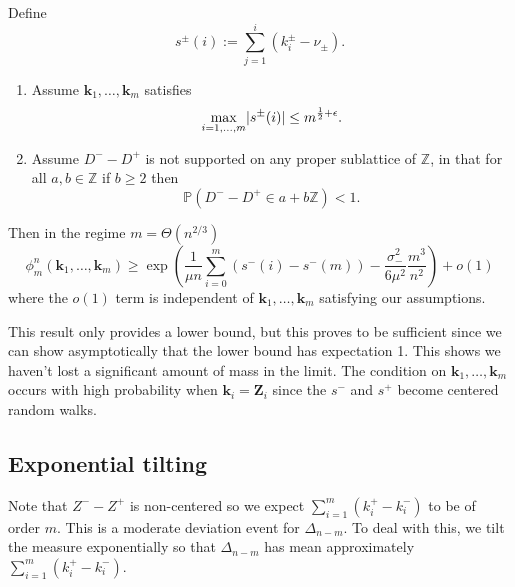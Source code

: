 \documentclass[draft]{scrartcl}
\newcommand{\Z}{\mathbb Z}
\newcommand{\littleo}{o}
\newcommand{\conmc}{\phi}
\newcommand{\defeq}{:=}
\newcommand{\vect}{\mathbf}
\renewcommand{\Pr}{\mathbb P}
\DeclarePairedDelimiter{\abs}{\lvert}{\rvert}
\newcommand{\biasvar}{\sigma_-^2}
\begin{document}
\begin{theorem}
    Define
    \begin{equation}
        s^{\pm}(i) \defeq \textstyle{\sum_{j=1}^i (k_i^{\pm} - \nu_{\pm})}.
    \end{equation}
    \begin{enumerate}
        \item Assume $\vect{k}_1, \ldots, \vect{k}_m$ satisfies
            \begin{equation}
                \label{eq:s-condition}
                \max_{i=1, \ldots, m} \abs{s^{\pm}(i)} \leq m^{\frac{1}{2} + \epsilon}.
            \end{equation}
        \item Assume $D^- - D^+$ is not supported on any proper sublattice of $\Z$, in that for all $a, b \in \Z$ if $b \geq 2$ then
            \begin{equation}
                \Pr(D^- - D^+ \in a + b\Z) < 1.
            \end{equation}
    \end{enumerate}
    Then in the regime $m = \Theta(n^{2/3})$
    \begin{equation}
        \conmc^n_m(\vect{k}_1, \ldots, \vect{k}_m)
        \geq \exp\left( \frac{1}{\mu n} \sum_{i=0}^m (s^-(i) - s^-(m)) - \frac{\biasvar}{6 \mu^2} \frac{m^3}{n^2} \right) + \littleo(1)
    \end{equation}
    where the $\littleo(1)$ term is independent of $\vect{k}_1, \ldots, \vect{k}_m$ satisfying our assumptions.
\end{theorem}

This result only provides a lower bound, but this proves to be sufficient since we can show asymptotically that the lower bound has expectation 1. This shows we haven't lost a significant amount of mass in the limit. The condition on $\vect{k}_1, \ldots, \vect{k}_m$ occurs with high probability when $\vect{k}_i = \vect{Z}_i$ since the $s^-$ and $s^+$ become centered random walks.

\subsection{Exponential tilting}

Note that $Z^- - Z^+$ is non-centered so we expect $\sum_{i=1}^m (k^+_i - k^-_i)$ to be of order $m$. This is a moderate deviation event for $\Delta_{n-m}$. To deal with this, we tilt the measure exponentially so that $\Delta_{n-m}$ has mean approximately $\sum_{i=1}^m (k^+_i - k^-_i)$. 
\end{document}
